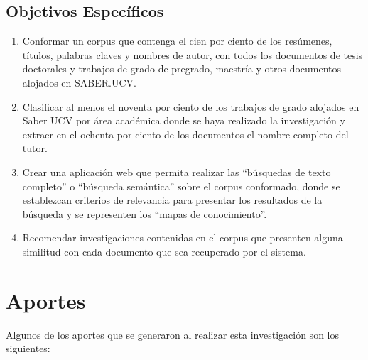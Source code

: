 \documentclass[
  12pt,
  openany]{book}
\begin{document}
\hypertarget{objeespe}{%
\subsection{Objetivos Específicos}\label{objeespe}}

\begin{enumerate}
\def\labelenumi{\arabic{enumi}.}
\item
  Conformar un corpus que contenga el cien por ciento de los resúmenes, títulos, palabras claves y nombres de autor, con todos los documentos de tesis doctorales y trabajos de grado de pregrado, maestría y otros documentos alojados en SABER.UCV.
\item
  Clasificar al menos el noventa por ciento de los trabajos de grado alojados en Saber UCV por área académica donde se haya realizado la investigación y extraer en el ochenta por ciento de los documentos el nombre completo del tutor.
\item
  Crear una aplicación web que permita realizar las ``búsquedas de texto completo'' o ``búsqueda semántica'' sobre el corpus conformado, donde se establezcan criterios de relevancia para presentar los resultados de la búsqueda y se representen los ``mapas de conocimiento''.
\item
  Recomendar investigaciones contenidas en el corpus que presenten alguna similitud con cada documento que sea recuperado por el sistema.
\end{enumerate}

\hypertarget{aporte}{%
\section{Aportes}\label{aporte}}

Algunos de los aportes que se generaron al realizar esta investigación son los siguientes:
\end{document}
